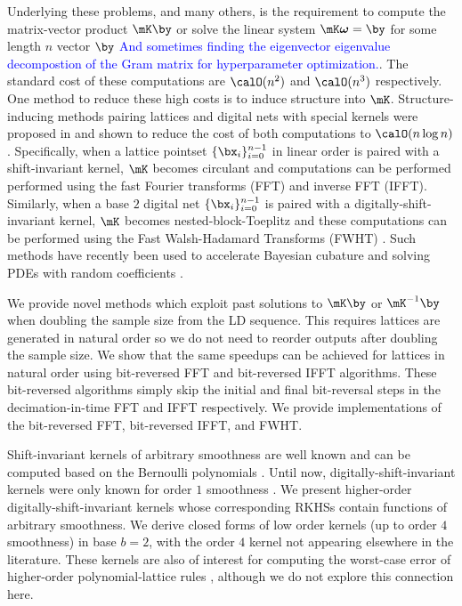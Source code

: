 \documentclass[acmsmall]{acmart}
\newcommand{\FJHNote}[1]{\textcolor{blue}{#1}}
\begin{document}
Underlying these problems, and many others, is the requirement to compute the matrix-vector product $\mK \by$ or solve the linear system $\mK \boldsymbol{\omega} =\by$ for some length $n$ vector $\by$ \FJHNote{And sometimes finding the eigenvector eigenvalue decompostion of the Gram matrix for hyperparameter optimization.}. The standard cost of these computations are $\calO(n^2)$ and $\calO(n^3)$ respectively. One method to reduce these high costs is to induce structure into $\mK$. Structure-inducing methods pairing lattices and digital nets with special kernels were proposed in \citep{zeng.spline_lattice_digital_net} and shown to reduce the cost of both computations to $\calO(n \log n)$. Specifically, when a lattice pointset $\{\bx_i\}_{i=0}^{n-1}$ in linear order is paired with a shift-invariant kernel, $\mK$ becomes circulant and computations can be performed performed using the fast Fourier transforms (FFT) and inverse FFT (IFFT). Similarly, when a base $2$ digital net $\{\bx_i\}_{i=0}^{n-1}$ is paired with a digitally-shift-invariant kernel, $\mK$ becomes nested-block-Toeplitz and these computations can be performed using the Fast Walsh-Hadamard Transforms (FWHT) \citep{fino.fwht}. Such methods have recently been used to accelerate Bayesian cubature \citep{rathinavel.bayesian_QMC_lattice,rathinavel.bayesian_QMC_sobol,rathinavel.bayesian_QMC_thesis} and solving PDEs with random coefficients \citep{kaarnioja.kernel_interpolants_lattice_rkhs,kaarnioja.kernel_interpolants_lattice_rkhs_serendipitous}.

We provide novel methods which exploit past solutions to $\mK\by$ or $\mK^{-1}\by$ when doubling the sample size from the LD sequence. This requires lattices are generated in natural order so we do not need to reorder outputs after doubling the sample size. We show that the same speedups can be achieved for lattices in natural order using bit-reversed FFT and bit-reversed IFFT algorithms. These bit-reversed algorithms simply skip the initial and final bit-reversal steps in the decimation-in-time FFT and IFFT respectively. We provide implementations of the bit-reversed FFT, bit-reversed IFFT, and FWHT. 

Shift-invariant kernels of arbitrary smoothness are well known and can be computed based on the Bernoulli polynomials \citep{kaarnioja.kernel_interpolants_lattice_rkhs,kaarnioja.kernel_interpolants_lattice_rkhs_serendipitous,cools2021fast,cools2020lattice,sloan2001tractability,kuo2004lattice}. Until now, digitally-shift-invariant kernels were only known for order $1$ smoothness \citep{dick.multivariate_integraion_sobolev_spaces_digital_nets}. We present higher-order digitally-shift-invariant kernels whose corresponding RKHSs contain functions of arbitrary smoothness. We derive closed forms of low order kernels (up to order $4$ smoothness) in base $b=2$, with the order $4$ kernel not appearing elsewhere in the literature. These kernels are also of interest for computing the worst-case error of higher-order polynomial-lattice rules \cite{baldeaux.polylat_efficient_comp_worse_case_error_cbc}, although we do not explore this connection here. 
\end{document}
